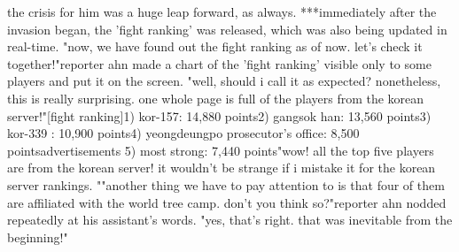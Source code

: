 the crisis for him was a huge leap forward, as always.
 ***immediately after the invasion began, the 'fight ranking' was released, which was also being updated in real-time.
"now, we have found out the fight ranking as of now.
 let's check it together!"reporter ahn made a chart of the 'fight ranking' visible only to some players and put it on the screen.
"well, should i call it as expected? nonetheless, this is really surprising.
 one whole page is full of the players from the korean server!"[fight ranking]1) kor-157: 14,880 points2) gangsok han: 13,560 points3) kor-339 : 10,900 points4) yeongdeungpo prosecutor's office: 8,500 pointsadvertisements    5) most strong: 7,440 points"wow! all the top five players are from the korean server! it wouldn't be strange if i mistake it for the korean server rankings.
""another thing we have to pay attention to is that four of them are affiliated with the world tree camp.
 don't you think so?"reporter ahn nodded repeatedly at his assistant's words.
"yes, that's right.
 that was inevitable from the beginning!"

 